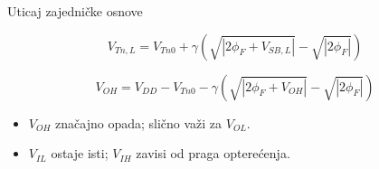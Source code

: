 \begin{frame}[label=09_1-s056]{Uticaj zajedničke osnove}\setlength{\parskip}{2pt}\setlength{\abovedisplayskip}{4pt}\setlength{\belowdisplayskip}{4pt}\setlength{\abovedisplayshortskip}{3pt}\setlength{\belowdisplayshortskip}{3pt}
\begin{center}\quad\raisebox{12mm}{$\longrightarrow$}\quad\end{center}\[V_{Tn,L}=V_{Tn0}+\gamma\left(\sqrt{|2\phi_F+V_{SB,L}|}-\sqrt{|2\phi_F|}\right)\]

\[V_{OH}=V_{DD}-V_{Tn0}-\gamma\left(\sqrt{|2\phi_F+V_{OH}|}-\sqrt{|2\phi_F|}\right)\]
\begin{itemize}\setlength{\itemsep}{1pt}\item $V_{OH}$ značajno opada; slično važi za $V_{OL}$.\item $V_{IL}$ ostaje isti; $V_{IH}$ zavisi od praga opterećenja.\end{itemize}
\end{frame}
